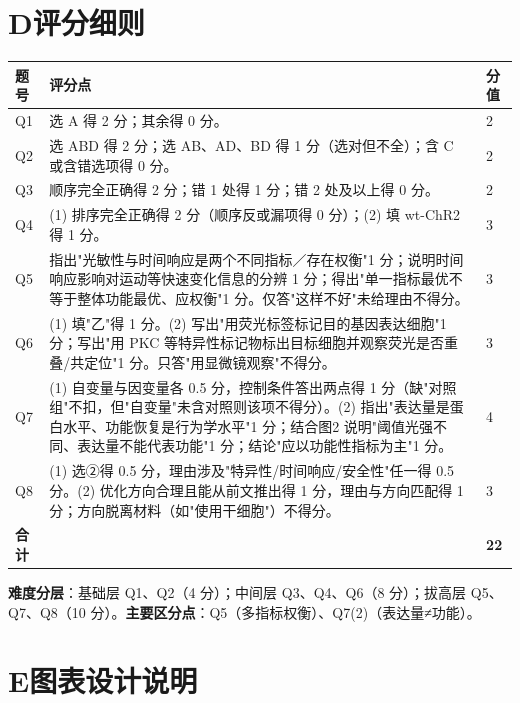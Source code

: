 \documentclass[UTF8,a4paper,11pt]{ctexart}
\begin{document}
\section{D\quad 评分细则}

\begin{longtable}{@{}p{1.1cm}p{12.0cm}p{1.6cm}@{}}
\toprule
\textbf{题号} & \textbf{评分点} & \textbf{分值} \\
\midrule
\endhead
Q1 & 选 A 得 2 分；其余得 0 分。 & 2 \\
Q2 & 选 ABD 得 2 分；选 AB、AD、BD 得 1 分（选对但不全）；含 C 或含错选项得 0 分。 & 2 \\
Q3 & 顺序完全正确得 2 分；错 1 处得 1 分；错 2 处及以上得 0 分。 & 2 \\
Q4 & (1) 排序完全正确得 2 分（顺序反或漏项得 0 分）；(2) 填 wt-ChR2 得 1 分。 & 3 \\
Q5 & 指出"光敏性与时间响应是两个不同指标／存在权衡"1 分；说明时间响应影响对运动等快速变化信息的分辨 1 分；得出"单一指标最优不等于整体功能最优、应权衡"1 分。仅答"这样不好"未给理由不得分。 & 3 \\
Q6 & (1) 填"乙"得 1 分。(2) 写出"用荧光标签标记目的基因表达细胞"1 分；写出"用 PKC 等特异性标记物标出目标细胞并观察荧光是否重叠/共定位"1 分。只答"用显微镜观察"不得分。 & 3 \\
Q7 & (1) 自变量与因变量各 0.5 分，控制条件答出两点得 1 分（缺"对照组"不扣，但"自变量"未含对照则该项不得分）。(2) 指出"表达量是蛋白水平、功能恢复是行为学水平"1 分；结合图2 说明"阈值光强不同、表达量不能代表功能"1 分；结论"应以功能性指标为主"1 分。 & 4 \\
Q8 & (1) 选②得 0.5 分，理由涉及"特异性/时间响应/安全性"任一得 0.5 分。(2) 优化方向合理且能从前文推出得 1 分，理由与方向匹配得 1 分；方向脱离材料（如"使用干细胞"）不得分。 & 3 \\
\midrule
\textbf{合计} & & \textbf{22} \\
\bottomrule
\end{longtable}

\noindent\textbf{难度分层}：基础层 Q1、Q2（4 分）；中间层 Q3、Q4、Q6（8 分）；拔高层 Q5、Q7、Q8（10 分）。\textbf{主要区分点}：Q5（多指标权衡）、Q7(2)（表达量≠功能）。

\section{E\quad 图表设计说明}
\end{document}
